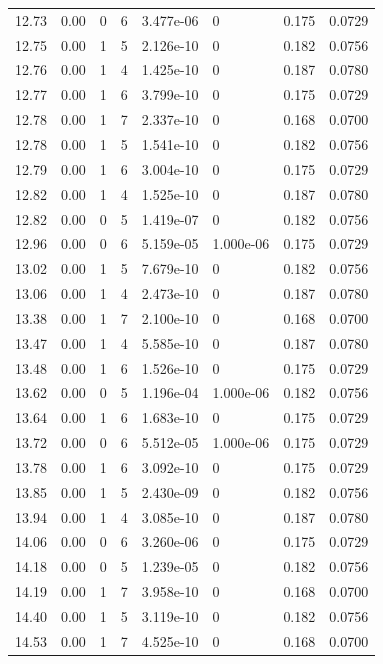 \documentclass[preview]{standalone}
\begin{document}
{{{\begin{tabular}{L{1.2cm}C{1.2cm} C{0.3cm}C{0.5cm} C{1.4cm}C{1.4cm} C{1.4cm}C{1.4cm}}
  12.73  &  0.00  & 0     &  6 &  3.477e-06  & 0  & 0.175 &  0.0729   \\ 
  12.75  &  0.00  & 1     &  5 &  2.126e-10  & 0  & 0.182 &  0.0756   \\ 
  12.76  &  0.00  & 1     &  4 &  1.425e-10  & 0  & 0.187 &  0.0780   \\ 
  12.77  &  0.00  & 1     &  6 &  3.799e-10  & 0  & 0.175 &  0.0729   \\ 
  12.78  &  0.00  & 1     &  7 &  2.337e-10  & 0  & 0.168 &  0.0700   \\ 
  12.78  &  0.00  & 1     &  5 &  1.541e-10  & 0  & 0.182 &  0.0756   \\ 
  12.79  &  0.00  & 1     &  6 &  3.004e-10  & 0  & 0.175 &  0.0729   \\ 
  12.82  &  0.00  & 1     &  4 &  1.525e-10  & 0  & 0.187 &  0.0780   \\ 
  12.82  &  0.00  & 0     &  5 &  1.419e-07  & 0  & 0.182 &  0.0756   \\ 
  12.96  &  0.00  & 0     &  6 &  5.159e-05  & 1.000e-06  & 0.175 &  0.0729   \\ 
  13.02  &  0.00  & 1     &  5 &  7.679e-10  & 0  & 0.182 &  0.0756   \\ 
  13.06  &  0.00  & 1     &  4 &  2.473e-10  & 0  & 0.187 &  0.0780   \\ 
  13.38  &  0.00  & 1     &  7 &  2.100e-10  & 0  & 0.168 &  0.0700   \\ 
  13.47  &  0.00  & 1     &  4 &  5.585e-10  & 0  & 0.187 &  0.0780   \\ 
  13.48  &  0.00  & 1     &  6 &  1.526e-10  & 0  & 0.175 &  0.0729   \\ 
  13.62  &  0.00  & 0     &  5 &  1.196e-04  & 1.000e-06  & 0.182 &  0.0756   \\ 
  13.64  &  0.00  & 1     &  6 &  1.683e-10  & 0  & 0.175 &  0.0729   \\ 
  13.72  &  0.00  & 0     &  6 &  5.512e-05  & 1.000e-06  & 0.175 &  0.0729   \\ 
  13.78  &  0.00  & 1     &  6 &  3.092e-10  & 0  & 0.175 &  0.0729   \\ 
  13.85  &  0.00  & 1     &  5 &  2.430e-09  & 0  & 0.182 &  0.0756   \\ 
  13.94  &  0.00  & 1     &  4 &  3.085e-10  & 0  & 0.187 &  0.0780   \\ 
  14.06  &  0.00  & 0     &  6 &  3.260e-06  & 0  & 0.175 &  0.0729   \\ 
  14.18  &  0.00  & 0     &  5 &  1.239e-05  & 0  & 0.182 &  0.0756   \\ 
  14.19  &  0.00  & 1     &  7 &  3.958e-10  & 0  & 0.168 &  0.0700   \\ 
  14.40  &  0.00  & 1     &  5 &  3.119e-10  & 0  & 0.182 &  0.0756   \\ 
  14.53  &  0.00  & 1     &  7 &  4.525e-10  & 0  & 0.168 &  0.0700   \\ 
\hline 
\end{tabular} 

}}}
\end{document}
